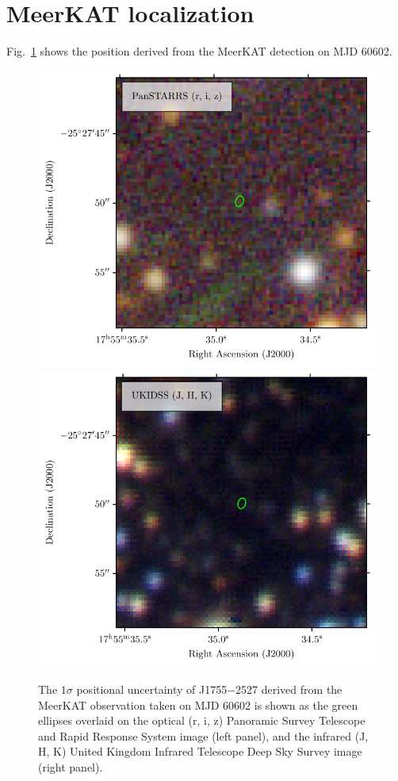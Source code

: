 \documentclass[fleqn,usenatbib]{mnras}
\newcommand{\revision}[2]{{\color{red}#2}}
\newcommand{\src}{J1755$-$2527}
\newcommand{\Fig}{Fig.}
\begin{document}








\appendix

\section{\revision{}{MeerKAT localization}}
\label{app:localization}

\Fig~\ref{fig:localization} shows the position derived from the MeerKAT detection on MJD 60602.

\begin{figure}
    \centering
    \includegraphics[width=0.48\linewidth]{J1755_optical.pdf}
    \includegraphics[width=0.48\linewidth]{J1755_nir.pdf}
    \caption{The $1\sigma$ positional uncertainty of \src{} derived from the MeerKAT observation taken on MJD 60602 is shown as the green ellipses overlaid on the optical (r, i, z) Panoramic Survey Telescope and Rapid Response System \citep[PanSTARRS;][]{2010SPIE.7733E..0EK,2016arXiv161205560C} image (left panel), and the infrared (J, H, K) United Kingdom Infrared Telescope Deep Sky Survey \citep[UKIDSS;][]{2007MNRAS.379.1599L} image (right panel).}
    \label{fig:localization}
\end{figure}
\end{document}
